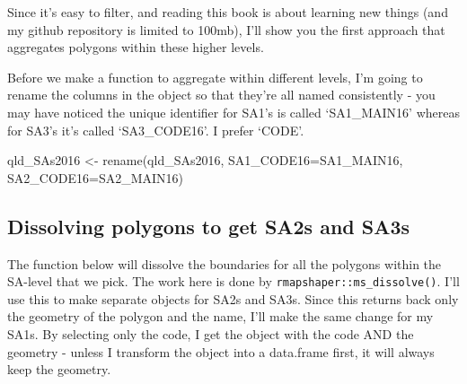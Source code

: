 \documentclass[
]{book}
\newenvironment{Shaded}{\begin{snugshade}}{\end{snugshade}}
\newcommand{\AttributeTok}[1]{\textcolor[rgb]{0.77,0.63,0.00}{#1}}
\newcommand{\FunctionTok}[1]{\textcolor[rgb]{0.00,0.00,0.00}{#1}}
\newcommand{\NormalTok}[1]{#1}
\newcommand{\OtherTok}[1]{\textcolor[rgb]{0.56,0.35,0.01}{#1}}
\begin{document}
Since it's easy to filter, and reading this book is about learning new things (and my github repository is limited to 100mb), I'll show you the first approach that aggregates polygons within these higher levels.

Before we make a function to aggregate within different levels, I'm going to rename the columns in the object so that they're all named consistently - you may have noticed the unique identifier for SA1's is called `SA1\_MAIN16' whereas for SA3's it's called `SA3\_CODE16'. I prefer `CODE'.

\begin{Shaded}
\begin{Highlighting}[]
\NormalTok{qld\_SAs2016 }\OtherTok{\textless{}{-}}
  \FunctionTok{rename}\NormalTok{(qld\_SAs2016, }\AttributeTok{SA1\_CODE16=}\NormalTok{SA1\_MAIN16, }\AttributeTok{SA2\_CODE16=}\NormalTok{SA2\_MAIN16)}
\end{Highlighting}
\end{Shaded}

\hypertarget{dissolving-polygons-to-get-sa2s-and-sa3s}{%
\subsection{Dissolving polygons to get SA2s and SA3s}\label{dissolving-polygons-to-get-sa2s-and-sa3s}}

The function below will dissolve the boundaries for all the polygons within the SA-level that we pick. The work here is done by \texttt{rmapshaper::ms\_dissolve()}. I'll use this to make separate objects for SA2s and SA3s. Since this returns back only the geometry of the polygon and the name, I'll make the same change for my SA1s. By selecting only the code, I get the object with the code AND the geometry - unless I transform the object into a data.frame first, it will always keep the geometry.
\end{document}
